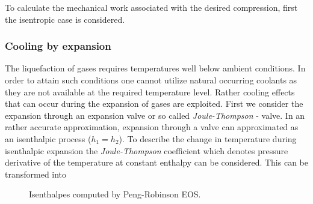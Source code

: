     	To calculate the mechanical work associated with the desired compression,
        first the isentropic case
        is considered.



    \subsubsection{Cooling by expansion}
        The liquefaction of gases requires temperatures well below ambient conditions. In order to attain
        such conditions one cannot utilize natural occurring coolants as they are not available at the required
        temperature level. Rather cooling effects that can occur during the expansion of gases are exploited.
        First we consider the expansion through an expansion valve or so called \emph{Joule-Thompson} - valve.
        In an rather accurate approximation, expansion through a valve can approximated as an isenthalpic
        process ($h_1 = h_2$). To describe the change in temperature during isenthalpic expansion
        the \emph{Joule-Thompson} coefficient
        which denotes pressure derivative of the temperature at constant enthalpy can be considered.
        This can be transformed into


        \begin{figure}
            \center
            
            \caption{Isenthalpes computed by Peng-Robinson EOS.}
            \label{fig:pr_isenthalpes}
        \end{figure}

